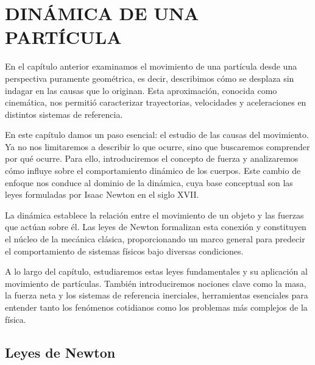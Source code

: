 \chapter[Dinámica de una partícula]{DINÁMICA DE UNA PARTÍCULA}\label{chap:cap2}
\startcontents
\printchaptertableofcontents

En el capítulo anterior examinamos el movimiento de una partícula desde una perspectiva puramente geométrica, es decir, describimos cómo se desplaza sin indagar en las causas que lo originan. Esta aproximación, conocida como cinemática, nos permitió caracterizar trayectorias, velocidades y aceleraciones en distintos sistemas de referencia.

En este capítulo damos un paso esencial: el estudio de las causas del movimiento. Ya no nos limitaremos a describir lo que ocurre, sino que buscaremos comprender por qué ocurre. Para ello, introduciremos el concepto de fuerza y analizaremos cómo influye sobre el comportamiento dinámico de los cuerpos. Este cambio de enfoque nos conduce al dominio de la dinámica, cuya base conceptual son las leyes formuladas por Isaac Newton en el siglo XVII.

La dinámica establece la relación entre el movimiento de un objeto y las fuerzas que actúan sobre él. Las leyes de Newton formalizan esta conexión y constituyen el núcleo de la mecánica clásica, proporcionando un marco general para predecir el comportamiento de sistemas físicos bajo diversas condiciones.

A lo largo del capítulo, estudiaremos estas leyes fundamentales y su aplicación al movimiento de partículas. También introduciremos nociones clave como la masa, la fuerza neta y los sistemas de referencia inerciales, herramientas esenciales para entender tanto los fenómenos cotidianos como los problemas más complejos de la física.

\section{Leyes de Newton}


